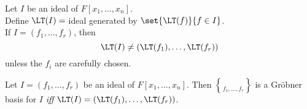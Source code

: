 Let $I$ be an ideal of $F[x_1,\dotsc,x_n]$. \\
Define $\LT(I)={}$ideal generated by $\set{\LT(f)}{f\in I}$. \\
\fact If $I=(f_1,\dotsc,f_r)$, then
\[ \LT(I) \neq (\LT(f_1),\dotsc,\LT(f_r)) \]
unless the $f_i$ are carefully chosen.

 Let $I=(f_1,\dotsc,f_r)$ be an ideal of $F[x_1,\dotsc,x_n]$.  Then $\brace{f_1,\dotsc,f_r}$ is a Gr\"obner basis for $I$ \emph{iff} $\LT(I)=(\LT(f_1),\dotsc,\LT(f_r))$.

